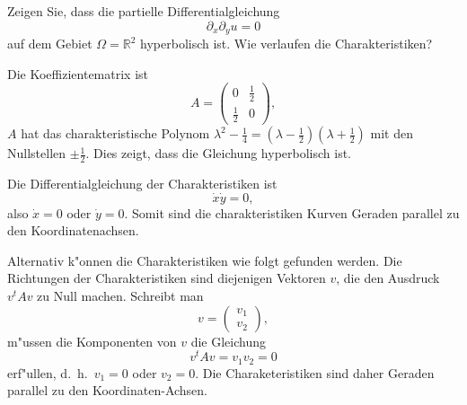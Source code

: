 Zeigen Sie, dass die partielle Differentialgleichung
\[
\partial_x\partial_y u=0
\]
auf dem Gebiet $\Omega=\mathbb R^2$ hyperbolisch ist.
Wie verlaufen die Charakteristiken?

\begin{loesung}
Die Koeffizientematrix ist
\[
A=\begin{pmatrix}0&\frac12\\\frac12&0\end{pmatrix},
\]
$A$ hat das charakteristische Polynom
$\lambda^2-\frac14=(\lambda-\frac12)(\lambda+\frac12)$ mit den Nullstellen
$\pm\frac12$. Dies zeigt, dass die Gleichung hyperbolisch ist.

Die Differentialgleichung der Charakteristiken ist
\[
\dot x\dot y=0,
\]
also $\dot x=0$ oder $\dot y=0$. Somit sind die charakteristiken Kurven
Geraden parallel zu den Koordinatenachsen.

Alternativ k"onnen die Charakteristiken wie folgt gefunden werden.
Die Richtungen der Charakteristiken sind diejenigen Vektoren $v$, die
den Ausdruck $v^tAv$ zu Null machen. Schreibt man
\[
v=\begin{pmatrix}v_1\\v_2\end{pmatrix},
\]
m"ussen die Komponenten von $v$ die Gleichung
\[
v^tAv=v_1v_2=0
\]
erf"ullen, d.~h.~$v_1=0$ oder $v_2=0$. Die Charaketeristiken sind daher
Geraden parallel zu den Koordinaten-Achsen.
\end{loesung}
